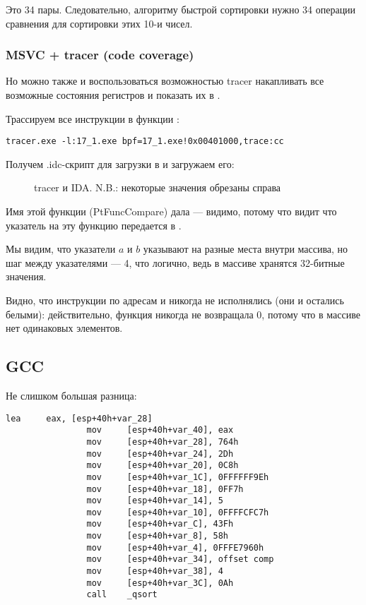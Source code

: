 Это 34 пары.
Следовательно, алгоритму быстрой сортировки нужно 34 операции сравнения для сортировки этих 10-и чисел.

\clearpage
\subsubsection{MSVC + tracer (code coverage)}

Но можно также и воспользоваться возможностью tracer накапливать все возможные состояния регистров и показать их в \IDA.

Трассируем все инструкции в функции \comp:

\begin{lstlisting}
tracer.exe -l:17_1.exe bpf=17_1.exe!0x00401000,trace:cc
\end{lstlisting}

Получем .idc-скрипт для загрузки в \IDA и загружаем его:

\begin{figure}[H]
\centering
{}
\caption{tracer и IDA. N.B.: 
некоторые значения обрезаны справа}
\label{fig:qsort_tracer_cc}
\end{figure}

Имя этой функции (PtFuncCompare) дала \IDA --- видимо, потому что видит что указатель на эту функцию передается в \qsort.

Мы видим, что указатели $a$ и $b$ указывают на разные места внутри массива, 
но шаг между указателями --- 4, что логично, ведь в массиве хранятся 32-битные значения.

Видно, что инструкции по адресам  и  никогда не исполнялись (они и остались белыми): 
действительно, функция \comp никогда не возвращала 0,
потому что в массиве нет одинаковых элементов.

\subsection{GCC}

Не слишком большая разница:

\begin{lstlisting}[caption=GCC]
                lea     eax, [esp+40h+var_28]
                mov     [esp+40h+var_40], eax
                mov     [esp+40h+var_28], 764h
                mov     [esp+40h+var_24], 2Dh
                mov     [esp+40h+var_20], 0C8h
                mov     [esp+40h+var_1C], 0FFFFFF9Eh
                mov     [esp+40h+var_18], 0FF7h
                mov     [esp+40h+var_14], 5
                mov     [esp+40h+var_10], 0FFFFCFC7h
                mov     [esp+40h+var_C], 43Fh
                mov     [esp+40h+var_8], 58h
                mov     [esp+40h+var_4], 0FFFE7960h
                mov     [esp+40h+var_34], offset comp
                mov     [esp+40h+var_38], 4
                mov     [esp+40h+var_3C], 0Ah
                call    _qsort
\end{lstlisting}

